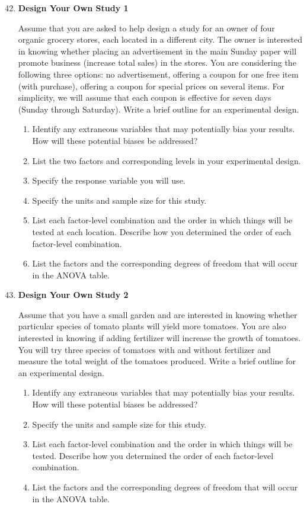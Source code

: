 \documentclass[
]{report}
\begin{document}
\begin{enumerate}
  \setcounter{enumi}{41}

  \item \textbf{Design Your Own Study 1}

Assume that you are asked to help design a study for an owner of four organic grocery stores, each located in a different city. The owner is interested in knowing whether placing an advertisement in the main Sunday paper will promote business (increase total sales) in the stores. You are considering the following three options: no advertisement, offering a coupon for one free item (with purchase), offering a coupon for special prices on several items. For simplicity, we will assume that each coupon is effective for seven days (Sunday through Saturday). Write a brief outline for an experimental design.
  \begin{enumerate}
    \item Identify any extraneous variables that may potentially bias your results. How will these potential biases be addressed?
    \item List the two factors and corresponding levels in your experimental design.
    \item Specify the response variable you will use.
    \item Specify the units and sample size for this study.
    \item List each factor-level combination and the order in which things will be tested at each location. Describe how you determined the order of each factor-level combination.
    \item List the factors and the corresponding degrees of freedom that will occur in the ANOVA table.
  \end{enumerate}

  \item \textbf{Design Your Own Study 2}

Assume that you have a small garden and are interested in knowing whether particular species of tomato plants will yield more tomatoes. You are also interested in knowing if adding fertilizer will increase the growth of tomatoes. You will try three species of tomatoes with and without fertilizer and measure the total weight of the tomatoes produced. Write a brief outline for an experimental design.
  \begin{enumerate}
    \item Identify any extraneous variables that may potentially bias your results. How will these potential biases be addressed?
    \item Specify the units and sample size for this study.
    \item List each factor-level combination and the order in which things will be tested. Describe how you determined the order of each factor-level combination.
    \item List the factors and the corresponding degrees of freedom that will occur in the ANOVA table.
  \end{enumerate}


\end{enumerate}
\end{document}
